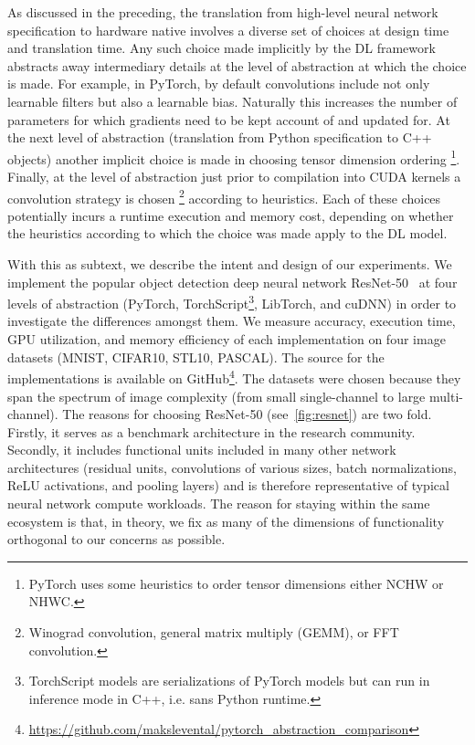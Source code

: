As discussed in the preceding, the translation from high-level neural network specification to hardware native involves a diverse set of choices at design time and translation time.
Any such choice made implicitly by the DL framework abstracts away intermediary details at the level of abstraction at which the choice is made.
For example, in PyTorch, by default convolutions include not only learnable filters but also a learnable bias.
Naturally this increases the number of parameters for which gradients need to be kept account of and updated for.
At the next level of abstraction (translation from Python specification to C++ objects) another implicit choice is made in choosing tensor dimension ordering%
\footnote{PyTorch uses some heuristics to order tensor dimensions either NCHW or NHWC.}.
Finally, at the level of abstraction just prior to compilation into CUDA kernels a convolution strategy is chosen%
\footnote{Winograd convolution, general matrix multiply (GEMM), or FFT convolution.} according to heuristics.
Each of these choices potentially incurs a runtime execution and memory cost, depending on whether the heuristics according to which the choice was made apply to the DL model.

With this as subtext, we describe the intent and design of our experiments.
We implement the popular object detection deep neural network ResNet-50~\cite{he2015deep} at four levels of abstraction (PyTorch, TorchScript\footnote{TorchScript models are serializations of PyTorch models but can run in inference mode in C++, i.e. sans Python runtime.}, LibTorch, and cuDNN) in order to investigate the differences amongst them.
We measure accuracy, execution time, GPU utilization, and memory efficiency of each implementation on four image datasets (MNIST, CIFAR10, STL10, PASCAL).
The source for the implementations is available on GitHub\footnote{\url{https://github.com/makslevental/pytorch_abstraction_comparison}}.
The datasets were chosen because they span the spectrum of image complexity (from small single-channel to large multi-channel).
The reasons for choosing ResNet-50 (see~\cref{fig:resnet}) are two fold.
Firstly, it serves as a benchmark architecture in the research community.
Secondly, it includes functional units included in many other network architectures (residual units, convolutions of various sizes, batch normalizations, ReLU activations, and pooling layers) and is therefore representative of typical neural network compute workloads.
The reason for staying within the same ecosystem is that, in theory, we fix as many of the dimensions of functionality orthogonal to our concerns as possible.

